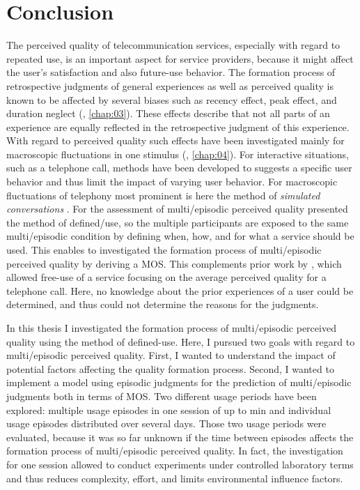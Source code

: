 \chapter{Conclusion}\label{chap:discussion}
The perceived quality of telecommunication services, especially with regard to repeated use, is an important aspect for service providers, because it might affect the user's satisfaction and also future-use behavior.
The formation process of retrospective judgments of general experiences as well as perceived quality is known to be affected by several biases such as recency effect, peak effect, and duration neglect (\cf, \autoref{chap:03}).
These effects describe that not all parts of an experience are equally reflected in the retrospective judgment of this experience.
With regard to perceived quality such effects have been investigated mainly for macroscopic fluctuations in one stimulus (\cf, \autoref{chap:04}).
For interactive situations, such as a telephone call, methods have been developed to suggests a specific user behavior and thus limit the impact of varying user behavior.
For macroscopic fluctuations of telephony most prominent is here the method of \emph{simulated conversations} \citep{weiss_modeling_2009}.
For the assessment of multi\-/episodic perceived quality \citet{moller_single-call_2011} presented the method of defined\-/use, so the multiple participants are exposed to the same multi\-/episodic condition by defining when, how, and for what a service should be used.
This enables to investigated the formation process of multi\-/episodic perceived quality by deriving a \ac{MOS}.
This complements prior work by \citet{duncanson_average_1969}, which allowed free-use of a service focusing on the average perceived quality for a telephone call.
Here, no knowledge about the prior experiences of a user could be determined, and thus could not determine the reasons for the judgments.

In this thesis I investigated the formation process of multi\-/episodic perceived quality using the method of defined-use.
Here, I pursued two goals with regard to multi\-/episodic perceived quality.
First, I wanted to understand the impact of potential factors affecting the quality formation process.
Second, I wanted to implement a model using episodic judgments for the prediction of multi\-/episodic judgments both in terms of \ac{MOS}.
Two different usage periods have been explored: multiple usage episodes in one session of up to \unit[45]{min} and individual usage episodes distributed over several days.
Those two usage periods were evaluated, because it was so far unknown if the time between episodes affects the formation process of multi\-/episodic perceived quality.
In fact, the investigation for one session allowed to conduct experiments under controlled laboratory terms and thus reduces complexity, effort, and limits environmental influence factors.

